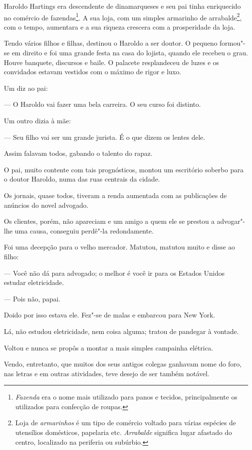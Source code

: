 Haroldo Hartings era descendente de dinamarqueses e seu pai tinha
enriquecido no comércio de fazendas\footnote{\emph{Fazenda} era o nome
  mais utilizado para panos e tecidos, principalmente os utilizados para
  confecção de roupas.}. A sua loja, com um simples armarinho de
arrabalde\footnote{Loja de \emph{armarinhos} é um tipo de comércio
  voltado para várias espécies de utensílios domésticos, papelaria etc.
  \emph{Arrabalde} significa lugar afastado do centro, localizado na
  periferia ou subúrbio.}, com o tempo, aumentara e a sua riqueza
crescera com a prosperidade da loja.

Tendo vários filhos e filhas, destinou o Haroldo a ser doutor. O pequeno
formou"-se em direito e foi uma grande festa na casa do lojista, quando
ele recebeu o grau. Houve banquete, discursos e baile. O palacete
resplandeceu de luzes e os convidados estavam vestidos com o máximo de
rigor e luxo.

Um diz ao pai:

--- O Haroldo vai fazer uma bela carreira. O seu curso foi distinto.

Um outro dizia à mãe:

--- Seu filho vai ser um grande jurista. É o que dizem os lentes dele.

Assim falavam todos, gabando o talento do rapaz.

O pai, muito contente com tais prognósticos, montou um escritório
soberbo para o doutor Haroldo, numa das ruas centrais da cidade.

Os jornais, quase todos, tiveram a renda aumentada com as publicações de
anúncios do novel advogado.

Os clientes, porém, não apareciam e um amigo a quem ele se prestou a
advogar"-lhe uma causa, conseguiu perdê"-la redondamente.

Foi uma decepção para o velho mercador. Matutou, matutou muito e disse
ao filho:

--- Você não dá para advogado; o melhor é você ir para os Estados Unidos
estudar eletricidade.

--- Pois não, papai.

Doido por isso estava ele. Fez"-se de malas e embarcou para New York.

Lá, não estudou eletricidade, nem coisa alguma; tratou de pandegar à
vontade.

Voltou e nunca se propôs a montar a mais simples campainha elétrica.

Vendo, entretanto, que muitos dos seus antigos colegas ganhavam nome do
foro, nas letras e em outras atividades, teve desejo de ser também
notável.

